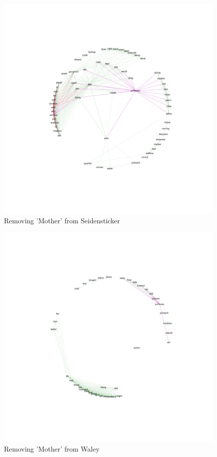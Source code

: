 \documentclass[12pt]{article}
\begin{document}
\begin{flushleft}
\begin{spacing}{2.0}
\begin{figure}
\includegraphics[width=6in]{seidensticker-no-mother.png}\hfill
\caption{Removing 'Mother' from Seidensticker}
\label{seiden-no-mom}
\end{figure}

\begin{figure}
\includegraphics[width=6in]{waley-no-mother.png}\hfill
\caption{Removing 'Mother' from Waley}
\label{waley-no-mom}
\end{figure}


\end{spacing}
\end{flushleft}
\end{document}

